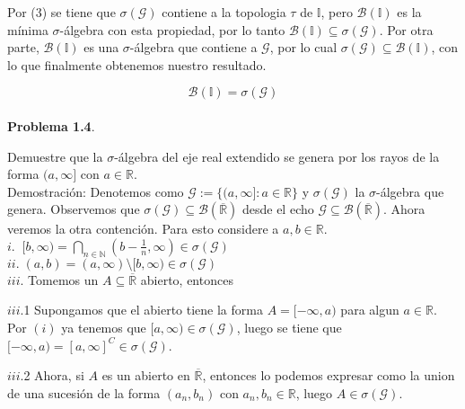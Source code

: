 \documentclass[12pt]{article}
\begin{document}
    Por (3) se tiene que $\sigma(\mathcal{G})$ contiene a la topologia $\tau$ de $\mathbb{I}$,
    pero $\mathscr{B}(\mathbb{I})$ es la m\'inima $\sigma$-\'algebra con esta propiedad, por
    lo tanto $\mathscr{B}(\mathbb{I})\subseteq \sigma(\mathcal{G})$.
    Por otra parte, $\mathscr{B}(\mathbb{I})$ es una $\sigma$-\'algebra que contiene a 
    $\mathcal{G}$, por lo cual $\sigma(\mathcal{G})\subseteq \mathscr{B}(\mathbb{I})$, con lo
    que finalmente obtenemos nuestro resultado.

    \[\mathscr{B}(\mathbb{I}) = \sigma(\mathcal{G})\]
    \\

    \textbf{Problema 1.4}. 
    
    Demuestre que la $\sigma$-\'algebra del eje real extendido se 
    genera por los rayos de la forma $(a,\infty]$ con $a\in \mathbb{R}$.
    \\

    Demostraci\'on: Denotemos como $\mathcal{G} := \{(a,\infty] : a\in \mathbb{R}\}$ y 
    $\sigma(\mathcal{G})$ la $\sigma$-\'algebra que genera. Observemos que 
    $\sigma(\mathcal{G})\subseteq \mathscr{B}(\overline{\mathbb{R}})$ desde el echo 
    $\mathcal{G}\subseteq \mathscr{B}(\overline{\mathbb{R}})$. Ahora veremos la otra 
    contenci\'on. Para esto considere a $a,b\in \mathbb{R}$.
    \\

    $i.\;\; [b,\infty) = \bigcap\limits_{n\in \mathbb{N}} (b-\frac{1}{n},\infty)\in \sigma(\mathcal{G})$ 
    \\

    $ii.\; (a,b) = (a,\infty)\setminus [b,\infty) \in \sigma(\mathcal{G})$
    \\

    $iii.$ Tomemos un $A\subseteq \overline{\mathbb{R}}$ abierto, entonces

    \hspace*{15pt} $iii$.1 Supongamos que el abierto tiene la forma $A = [-\infty,a)$ para algun 
    $a\in\mathbb{R}$. Por \hspace*{58pt} $(i)$ ya tenemos que $[a,\infty)\in \sigma(\mathcal{G})$, luego se 
    tiene que $[-\infty,a) = [a,\infty]^C \in \sigma(\mathcal{G})$.
    
    \hspace*{15pt} $iii$.2 Ahora, si $A$ es un abierto en $\overline{\mathbb{R}}$, entonces lo podemos 
    expresar como la union de \hspace*{58pt} una sucesi\'on de la forma $(a_n,b_n)$ con 
    $a_n,b_n\in \mathbb{R}$, luego $A\in \sigma(\mathcal{G})$.
    \\
\end{document}
